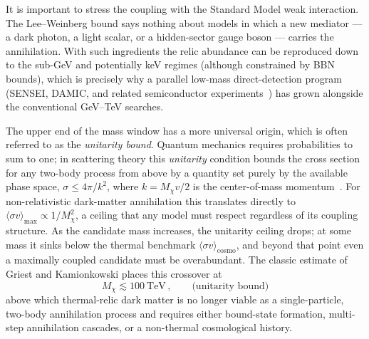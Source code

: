 It is important to stress the coupling with the Standard Model weak interaction.
The Lee--Weinberg bound says nothing about models in which a new mediator --- a dark photon, a light scalar, or a hidden-sector gauge boson --- carries the annihilation.
With such ingredients the relic abundance can be reproduced down to the sub-GeV and potentially keV regimes (although constrained by BBN bounds), which is precisely why a parallel low-mass direct-detection program (SENSEI, DAMIC, and related semiconductor experiments~\cite{SENSEI:2020dpa,DAMIC-M:2023gxo}) has grown alongside the conventional GeV--TeV searches.

The upper end of the mass window has a more universal origin, which is often referred to as the \emph{unitarity bound}.
Quantum mechanics requires probabilities to sum to one; in scattering theory this \emph{unitarity} condition bounds the cross section for any two-body process from above by a quantity set purely by the available phase space, $\sigma \leq 4\pi/k^2$, where $k = M_\chi v/2$ is the center-of-mass momentum~\cite{Griest:1989wd}.
For non-relativistic dark-matter annihilation this translates directly to $\langle \sigma v \rangle_\mathrm{max} \propto 1/M_\chi^2$, a ceiling that any model must respect regardless of its coupling structure.
As the candidate mass increases, the unitarity ceiling drops; at some mass it sinks below the thermal benchmark $\langle \sigma v \rangle_\mathrm{cosmo}$, and beyond that point even a maximally coupled candidate must be overabundant.
The classic estimate of Griest and Kamionkowski places this crossover at~\cite{Griest:1989wd}
\begin{equation}
	M_\chi \lesssim 100~\mathrm{TeV}\,, \qquad \text{(unitarity bound)}
	\label{eq:unitarity}
\end{equation}
above which thermal-relic dark matter is no longer viable as a single-particle, two-body annihilation process and requires either bound-state formation, multi-step annihilation cascades, or a non-thermal cosmological history.


